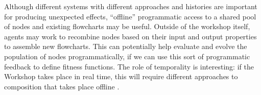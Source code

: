 Although different systems with different approaches and histories are
important for producing unexpected effects, ``offline'' programmatic
access to a shared pool of nodes and existing flowcharts may be
useful.  Outside of the workshop itself, agents may work to recombine
nodes based on their input and output properties to assemble new
flowcharts.  This can potentially help evaluate and evolve the
population of nodes programmatically, if we can use this sort of
programmatic feedback to define fitness functions.  The role of
temporality is interesting: if the Workshop takes place in real time,
this will require different approaches to composition that takes place
offline \cite{perez2013rolling}.
